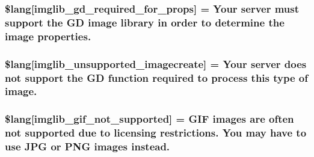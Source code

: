 \subsubsection[{\$lang}]{\setlength{\rightskip}{0pt plus 5cm}\$lang\mbox{[}\textquotesingle{}imglib\+\_\+gd\+\_\+required\+\_\+for\+\_\+props\textquotesingle{}\mbox{]} = \textquotesingle{}Your server must support the G\+D image library in order to determine the image properties.\textquotesingle{}}\label{system_2language_2english_2imglib__lang_8php_a0da9c99f9e2b5f38ccbefb9d9f702c5e}
\hypertarget{system_2language_2english_2imglib__lang_8php_ace032cbe8dafb1f3417a758d0914ecdb}{}
\subsubsection[{\$lang}]{\setlength{\rightskip}{0pt plus 5cm}\$lang\mbox{[}\textquotesingle{}imglib\+\_\+unsupported\+\_\+imagecreate\textquotesingle{}\mbox{]} = \textquotesingle{}Your server does not support the G\+D function required to process this type of image.\textquotesingle{}}\label{system_2language_2english_2imglib__lang_8php_ace032cbe8dafb1f3417a758d0914ecdb}
\hypertarget{system_2language_2english_2imglib__lang_8php_a235a59a6660145fc136b3933b5b10675}{}
\subsubsection[{\$lang}]{\setlength{\rightskip}{0pt plus 5cm}\$lang\mbox{[}\textquotesingle{}imglib\+\_\+gif\+\_\+not\+\_\+supported\textquotesingle{}\mbox{]} = \textquotesingle{}G\+I\+F images are often not supported due to licensing restrictions. You may have to use J\+P\+G or P\+N\+G images instead.\textquotesingle{}}\label{system_2language_2english_2imglib__lang_8php_a235a59a6660145fc136b3933b5b10675}
\hypertarget{system_2language_2english_2imglib__lang_8php_a4acdc927c172bab1370b2897c667c552}{}
